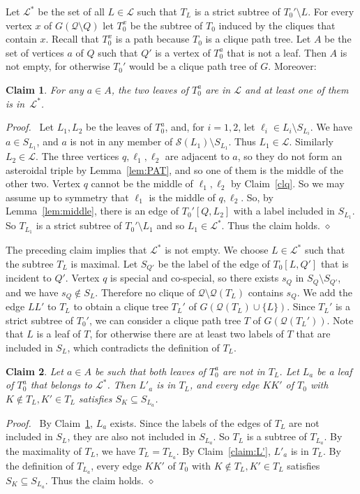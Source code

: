 \documentclass[11pt]{article}
\newtheorem{claim}{Claim}
\newenvironment{proofcl}{\noindent \emph{Proof.}\ }{Thus the claim
holds.  \hfill $\diamond$\vspace{1em}}
\begin{document}
Let $\mathcal L^*$ be the set of all $L\in \mathcal L$ such that $T_L$
is a strict subtree of $T_0'\setminus L$.  For every vertex $x$ of
$G(\mathcal Q\setminus Q)$ let $T_0^x$ be the subtree of $T_0$ induced
by the cliques that contain $x$.  Recall that $T_0^x$ is a path
because $T_0$ is a clique path tree.  Let $A$ be the set of vertices
$a$ of $Q$ such that $Q'$ is a vertex of $T_0^a$ that is not a leaf.
Then $A$ is not empty, for otherwise $T_0'$ would be a clique path
tree of $G$.  Moreover:
\begin{claim}\label{cla}
    For any $a\in A$, the two leaves of $T_0^a$ are in $\mathcal L$ and
    at least one of them is in~$\mathcal L^*$.
    \end{claim}
\begin{proofcl}
Let $L_1, L_2$ be the leaves of $T_0^a$, and, for $i=1, 2$, let
$\ell_i \in L_i\setminus S_{L_i}$.  We have $a\in S_{L_1}$, and $a$ is
not in any member of $\mathcal S(L_1)\setminus S_{L_1}$.  Thus $L_1\in
\mathcal L$.  Similarly $L_2\in \mathcal L$.  The three vertices $q,
\ell_1, \ell_2$ are adjacent to $a$, so they do not form an asteroidal
triple by Lemma~\ref{lem:PAT}, and so one of them is the middle of the
other two.  Vertex $q$ cannot be the middle of $\ell_1, \ell_2$ by
Claim~\ref{clq}.  So we may assume up to symmetry that $\ell_1$ is the
middle of $q, \ell_2$.  So, by Lemma~\ref{lem:middle}, there is an
edge of $T_0'[Q, L_2]$ with a label included in $S_{L_1}$.  So
$T_{L_1}$ is a strict subtree of $T_0'\setminus L_1$ and so
$L_1\in\mathcal L^*$.
\end{proofcl}

The preceding claim implies that $\mathcal L^*$ is not empty.  We
choose $L\in \mathcal L^*$ such that the subtree $T_L$ is maximal.
Let $S_{Q'}$ be the label of the edge of $T_0[L, Q']$ that is incident
to $Q'$.  Vertex $q$ is special and co-special, so there exists $s_Q$
in $S_Q\setminus S_{Q'}$, and we have $s_Q \notin S_L$.  Therefore no
clique of $\mathcal Q\setminus \mathcal Q(T_L)$ contains $s_Q$.  We
add the edge $LL'$ to $T_L$ to obtain a clique tree $T_L'$ of
$G(\mathcal Q(T_L)\cup \{L\})$.  Since $T_L'$ is a strict subtree of
$T_0'$, we can consider a clique path tree $T$ of $G(\mathcal
Q(T_L'))$.  Note that $L$ is a leaf of $T$, for otherwise there are at
least two labels of $T$ that are included in $S_L$, which contradicts
the definition of $T_L$.

\begin{claim}
\label{cl:orange}
Let $a\in A$ be such that both leaves of $T_0^a$ are not in $T_L$.
Let $L_a$ be a leaf of $T_0^a$ that belongs to $\mathcal L^*$.  Then
$L'_a$ is in $T_L$, and every edge $KK'$ of $T_0$ with $K\notin T_L,
K'\in T_L$ satisfies $S_K\subseteq S_{L_a}$.
\end{claim}
\begin{proofcl}
By Claim~\ref{cla}, $L_a$ exists.  Since the labels of the edges of
$T_L$ are not included in $S_L$, they are also not included in
$S_{L_a}$.  So $T_L$ is a subtree of $T_{L_a}$.  By the maximality of
$T_L$, we have $T_L=T_{L_a}$.  By Claim~\ref{claim:L'}, $L'_a$ is in
$T_L$.  By the definition of $T_{L_a}$, every edge $KK'$ of $T_0$ with
$K\notin T_L, K'\in T_L$ satisfies $S_K\subseteq S_{L_a}$.
\end{proofcl}
\end{document}

